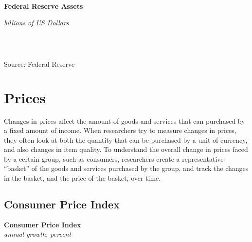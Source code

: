\documentclass{report}
\makeatletter
\newcommand*\short[1]{\expandafter\@gobbletwo\number\numexpr#1\relax}
\newcommand{\dateaxisticks}{
		date coordinates in=x, axis line style={draw=none},
		xmax={2020-10-01},
		max space between ticks=40,	    
		xtick={{1990-01-01}, {1992-01-01}, {1994-01-01}, 
			{1996-01-01}, {1998-01-01}, {2000-01-01}, 
			{2002-01-01}, {2004-01-01}, {2006-01-01},
			{2008-01-01}, {2010-01-01}, {2012-01-01}, {2014-01-01},
		    {2016-01-01}, {2018-01-01}, {2020-01-01}},
		minor xtick={{1989-01-01}, {1991-01-01}, {1993-01-01},
			{1995-01-01}, {1997-01-01}, {1999-01-01}, 
			{2001-01-01}, {2003-01-01}, {2005-01-01}, {2007-01-01},
		    {2009-01-01}, {2011-01-01}, {2013-01-01}, {2015-01-01},
		    {2017-01-01}, {2019-01-01}},
		enlarge y limits={0.06}, enlarge x limits={0.01},
		}
\newcommand{\bbar}[2]{extra #1 ticks = {{#2}}, extra #1 tick labels = ,
		extra #1 tick style = {grid=major, grid style={thick, black!25}},}
\newcommand{\stdline}[4]{\addplot[very thick, no markers, color=#1] 
		table [x=#2, y=#3, col sep=comma] {#4};	}
\newcommand{\rbars}{
		\fill[color=black!10] (axis cs:{1990-07-01},\pgfkeysvalueof{/pgfplots/ymin}) rectangle 
			(axis cs:{1991-03-01}, \pgfkeysvalueof{/pgfplots/ymax});
		\fill[color=black!10] (axis cs:{2007-12-01},\pgfkeysvalueof{/pgfplots/ymin}) rectangle 
			(axis cs:{2009-07-01}, \pgfkeysvalueof{/pgfplots/ymax});
		\fill[color=black!10] (axis cs:{2001-03-01},\pgfkeysvalueof{/pgfplots/ymin}) rectangle 
			(axis cs:{2001-11-01}, \pgfkeysvalueof{/pgfplots/ymax});
		\fill[color=black!10] (axis cs:{2020-02-01},\pgfkeysvalueof{/pgfplots/ymin}) rectangle 
			(axis cs:{2020-10-01}, \pgfkeysvalueof{/pgfplots/ymax});}
\makeatother
\begin{document}
{{{{{{{{{\vspace{10mm}

\normalsize \textbf{Federal Reserve Assets}\\
\footnotesize{\textit{billions of US Dollars}\\ \vspace{4mm}
\hspace*{-3mm}  \setlength{\tabcolsep}{3.1pt} \color{black!90}
		{\renewcommand{\arraystretch}{1.54}
\begin{tabular}{p{40mm} R{13.0mm} R{13.0mm} R{13.0mm}
		 		 R{13.0mm} R{13.0mm}}
			 
			 \hline
		\end{tabular}
		}	\\}
		
\vspace{-5.5mm}
\footnotesize{Source: Federal Reserve}
\newpage

\begin{minipage}{0.76\textwidth}
\section*{\color{darkgray}\LARGE Prices}
\label{sec:pr}
\small Changes in prices affect the amount of goods and services that can purchased by a fixed amount of income. When researchers try to measure changes in prices, they often look at both the quantity that can be purchased by a unit of currency, and also changes in item quality. To understand the overall change in prices faced by a certain group, such as consumers, researchers create a representative ``basket'' of the goods and services purchased by the group, and track the changes in the basket, and the price of the basket, over time. 

\subsection*{\color{black!70} \seriffont Consumer Price Index}

\small 

\vspace{4mm}

\normalsize \textbf{Consumer Price Index}\\
\footnotesize{\textit{annual growth, percent}}\\
\vspace{25mm}

\noindent \hspace{3mm} \\


\end{minipage}}}}}}}}}}
\end{document}
